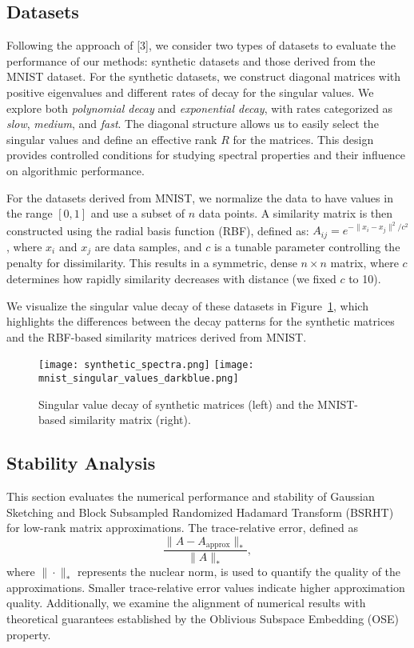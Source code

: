 \documentclass[a4paper, 12pt,oneside]{article}
\begin{document}
		\subsection{Datasets}
		Following the approach of [3], we consider two types of datasets to evaluate the performance of our methods: synthetic datasets and those derived from the MNIST dataset. For the synthetic datasets, we construct diagonal matrices with positive eigenvalues and different rates of decay for the singular values. We explore both \textit{polynomial decay} and \textit{exponential decay}, with rates categorized as \textit{slow}, \textit{medium}, and \textit{fast}. The diagonal structure allows us to easily select the singular values and define an effective rank \( R \) for the matrices. This design provides controlled conditions for studying spectral properties and their influence on algorithmic performance.

	For the datasets derived from MNIST, we normalize the data to have values in the range \([0, 1]\) and use a subset of \( n \) data points. A similarity matrix is then constructed using the radial basis function (RBF), defined as:
	$A_{ij} = e^{-\|x_i - x_j\|^2 / c^2}$, where \( x_i \) and \( x_j \) are data samples, and \( c \) is a tunable parameter controlling the penalty for dissimilarity. This results in a symmetric, dense \( n \times n \) matrix, where \( c \) determines how rapidly similarity decreases with distance (we fixed $c$ to 10). 

	We visualize the singular value decay of these datasets in Figure~\ref{fig:singular_value_comparison}, which highlights the differences between the decay patterns for the synthetic matrices and the RBF-based similarity matrices derived from MNIST.
	\begin{figure}[H]
		\centering
		\texttt{[image: synthetic\_spectra.png]}
		\hspace{0.02\textwidth} %
		\texttt{[image: mnist\_singular\_values\_darkblue.png]}
		\caption{Singular value decay of synthetic matrices (left) and the MNIST-based similarity matrix (right).}
		\label{fig:singular_value_comparison}
	\end{figure}
	\subsection{Stability Analysis}
This section evaluates the numerical performance and stability of Gaussian Sketching and Block Subsampled Randomized Hadamard Transform (BSRHT) for low-rank matrix approximations. The trace-relative error, defined as 
\begin{equation}
\frac{\|A - A_{\text{approx}}\|_*}{\|A\|_*},
\end{equation}
where $\|\cdot\|_*$ represents the nuclear norm, is used to quantify the quality of the approximations. Smaller trace-relative error values indicate higher approximation quality. Additionally, we examine the alignment of numerical results with theoretical guarantees established by the Oblivious Subspace Embedding (OSE) property.
\end{document}
